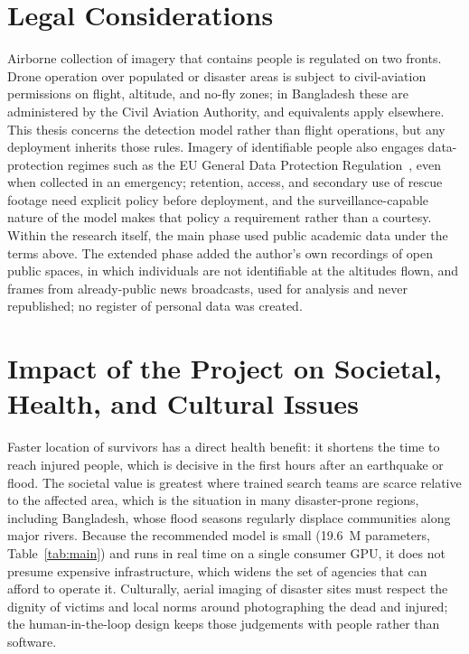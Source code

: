 \section{Legal Considerations}
\label{sec:legal5}
Airborne collection of imagery that contains people is regulated on two
fronts. Drone operation over populated or disaster areas is subject to
civil-aviation permissions on flight, altitude, and no-fly zones; in
Bangladesh these are administered by the Civil Aviation Authority, and
equivalents apply elsewhere. This thesis concerns the detection model rather
than flight operations, but any deployment inherits those rules. Imagery of
identifiable people also engages data-protection regimes such as the EU
General Data Protection Regulation~\cite{gdpr2016}, even when collected in
an emergency; retention, access, and secondary use of rescue footage need
explicit policy before deployment, and the surveillance-capable nature of
the model makes that policy a requirement rather than a courtesy. Within the
research itself, the main phase used public academic data under the terms
above. The extended phase added the author's own recordings of open public
spaces, in which individuals are not identifiable at the altitudes flown, and
frames from already-public news broadcasts, used for analysis and never
republished; no register of personal data was created.

\section{Impact of the Project on Societal, Health, and Cultural Issues}
Faster location of survivors has a direct health benefit: it shortens the time
to reach injured people, which is decisive in the first hours after an
earthquake or flood. The societal value is greatest where trained search teams
are scarce relative to the affected area, which is the situation in many
disaster-prone regions, including Bangladesh, whose flood seasons regularly
displace communities along major rivers. Because the recommended model is
small (19.6~M parameters, Table~\ref{tab:main}) and runs in real time on a
single consumer GPU, it does not presume expensive infrastructure, which
widens the set of agencies that can afford to operate it. Culturally, aerial
imaging of disaster sites must respect the dignity of victims and local norms
around photographing the dead and injured; the human-in-the-loop design keeps
those judgements with people rather than software.

